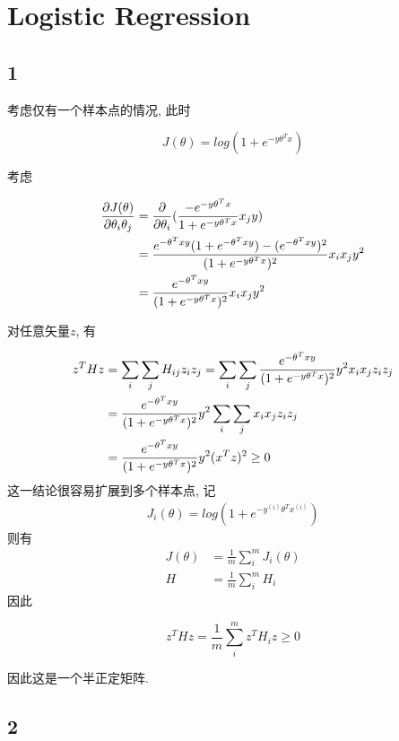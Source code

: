 \documentclass{ctexart}
\begin{document}
	\section{Logistic Regression}
	\subsection{1}
	
	考虑仅有一个样本点的情况, 此时
	
	\begin{equation}
		J(\theta) = log(1 + e^{-y\theta^Tx})
	\end{equation}
	
	考虑
	
	\begin{align}
		\frac{\partial J(\theta)}{\partial \theta_i \theta_j} &= \frac{\partial}{\partial \theta_i}(\frac{-e^{-y\theta^Tx}}{1 + e^{-y\theta^Tx}} x_j y) \notag \\
		&= \frac{e^{-\theta^Txy}(1 + e^{-\theta^Txy}) - (e^{-\theta^Txy})^2}{(1 + e^{-y\theta^Tx})^2}x_i x_j y^2 \notag \\
		&= \frac{e^{-\theta^Txy}}{(1 + e^{-y\theta^Tx})^2}x_i x_j y^2
	\end{align}
	
	对任意矢量$z$, 有
	
	\begin{align}
		z^THz &= \sum_i \sum_j H_{ij} z_i z_j = \sum_i \sum_j \frac{e^{-\theta^Txy}}{(1 + e^{-y\theta^Tx})^2} y^2 x_i x_j z_i z_j \notag \\
		&= \frac{e^{-\theta^Txy}}{(1 + e^{-y\theta^Tx})^2} y^2 \sum_i \sum_j  x_i x_j z_i z_j \notag \\
		&= \frac{e^{-\theta^Txy}}{(1 + e^{-y\theta^Tx})^2} y^2 (x^Tz)^2 \ge 0
	\end{align}
	这一结论很容易扩展到多个样本点, 记
	\begin{align}
		J_i(\theta) = log(1 + e^{-y^{(i)}\theta^Tx^{(i)}})
	\end{align}
	则有
	\begin{align}
		J(\theta) &= \frac{1}{m}\sum_i^m J_i(\theta) \\
		H &= \frac{1}{m} \sum_i^m H_i
	\end{align}
	因此
	
	\begin{equation}
		z^THz = \frac{1}{m}\sum_i^m z^TH_iz \ge 0 
	\end{equation}
	
	因此这是一个半正定矩阵.
	
	\subsection{2}
	
\end{document}

